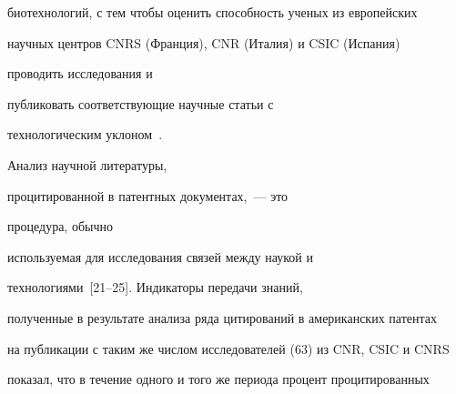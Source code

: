 биотехнологий, с тем чтобы оценить способность ученых из европейских 


научных центров CNRS (Франция), CNR (Италия) и CSIC (Испания) 


проводить исследования и\linebreak\vspace*{-12pt}




      


      \noindent


       пуб\-ли\-ко\-вать соответствующие научные статьи с 


технологическим уклоном~\cite{19-koz}.


       Анализ научной литературы, 


процитированной в патентных документах,~--- это


       процедура, обычно 


используемая для исследования связей между наукой и 


     технологиями~[21--25]. Индикаторы передачи знаний, 


полученные в результате анализа ряда цитирований в американских патентах 


на публикации с таким же числом исследователей (63) из CNR, CSIC и CNRS 


показал, что в течение одного и того же периода процент процитированных 


